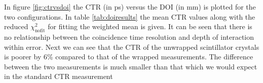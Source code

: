 In figure \ref{fig:ctrvsdoi} the CTR (in ps) versus the DOI (in mm) is plotted for the two configurations. In table \ref{tab:doiresults} the mean CTR values along with the reduced $\chi^2_\text{nofit}$ for fitting the weighted mean is given. It can be seen that there is no relationship between the coincidence time resolution and depth of interaction within error. Next we can see that the CTR of the unwrapped scintillator crystals is poorer by 6\% compared to that of the wrapped measurements. The difference between the two measurements is much smaller than that which we would expect in the standard CTR measurement\cite{r_Paganoni_Pauwels_et_al__2011}\cite{uffray_Jarron_Meyer_Lecoq_2013}
